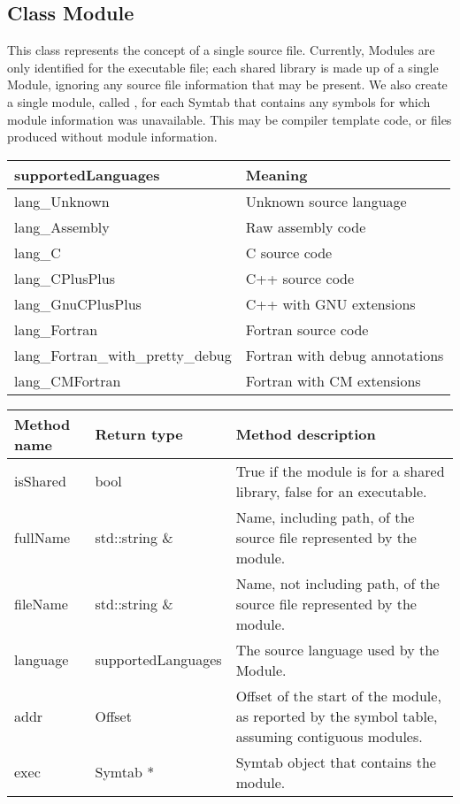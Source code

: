 \subsection{Class Module}\label{Module}
This class represents the concept of a single source file. Currently, Modules are only identified for the executable file; each shared library is made up of a single Module, ignoring any source file information that may be present. We also create a single module, called , for each Symtab that contains any symbols for which module information was unavailable. This may be compiler template code, or files produced without module information.

\begin{center}
\begin{tabular}{ll}
\toprule
supportedLanguages & Meaning \\
\midrule
lang\_Unknown & Unknown source language \\
lang\_Assembly & Raw assembly code \\
lang\_C & C source code \\
lang\_CPlusPlus & C++ source code \\
lang\_GnuCPlusPlus & C++ with GNU extensions \\
lang\_Fortran & Fortran source code \\
lang\_Fortran\_with\_pretty\_debug & Fortran with debug annotations \\
lang\_CMFortran & Fortran with CM extensions \\
\bottomrule
\end{tabular}
\end{center}

\begin{tabular}{p{1.25in}p{1.25in}p{3in}}
\toprule
Method name & Return type & Method description \\
\midrule
isShared & bool & True if the module is for a shared library, false for an executable. \\
fullName & std::string \& & Name, including path, of the source file represented by the module. \\
fileName & std::string \& & Name, not including path, of the source file represented by the module. \\
language & supportedLanguages & The source language used by the Module. \\
addr & Offset & Offset of the start of the module, as reported by the symbol table, assuming contiguous modules. \\
exec & Symtab * & Symtab object that contains the module. \\
\bottomrule
\end{tabular}


